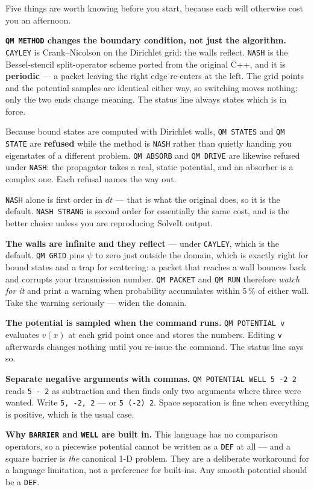 \documentclass[11pt]{article}
\newcommand{\kw}[1]{\texttt{\uppercase{#1}}}
\newcommand{\code}[1]{\texttt{#1}}
\begin{document}
Five things are worth knowing before you start, because each will
otherwise cost you an afternoon.

\textbf{\code{QM METHOD} changes the boundary condition, not just the
algorithm.} \code{CAYLEY} is Crank--Nicolson on the Dirichlet grid: the
walls reflect. \code{NASH} is the Bessel-stencil split-operator scheme
ported from the original C++, and it is \textbf{periodic} --- a packet
leaving the right edge re-enters at the left. The grid points and the
potential samples are identical either way, so switching moves nothing;
only the two ends change meaning. The status line always states which
is in force.

Because bound states are computed with Dirichlet walls, \code{QM STATES}
and \code{QM STATE} are \textbf{refused} while the method is
\code{NASH} rather than quietly handing you eigenstates of a different
problem. \code{QM ABSORB} and \code{QM DRIVE} are likewise refused
under \code{NASH}: the propagator takes a real, static potential, and an
absorber is a complex one. Each refusal names the way out.

\code{NASH} alone is first order in $dt$ --- that is what the original
does, so it is the default. \code{NASH STRANG} is second order for
essentially the same cost, and is the better choice unless you are
reproducing SolveIt output.

\textbf{The walls are infinite and they reflect} --- under
\code{CAYLEY}, which is the default. \code{QM GRID} pins
$\psi$ to zero just outside the domain, which is exactly right for bound
states and a trap for scattering: a packet that reaches a wall bounces
back and corrupts your transmission number. \code{QM PACKET} and
\code{QM RUN} therefore \emph{watch for it} and print a warning when
probability accumulates within 5\,\% of either wall. Take the warning
seriously --- widen the domain.

\textbf{The potential is sampled when the command runs.}
\code{QM POTENTIAL v} evaluates $v(x)$ at each grid point once and
stores the numbers. Editing \code{v} afterwards changes nothing until
you re-issue the command. The status line says so.

\textbf{Separate negative arguments with commas.}
\code{QM POTENTIAL WELL 5 -2 2} reads \code{5 - 2} as subtraction and
then finds only two arguments where three were wanted. Write
\code{5, -2, 2} --- or \code{5 (-2) 2}. Space separation is fine when
everything is positive, which is the usual case.

\textbf{Why \code{BARRIER} and \code{WELL} are built in.} This language
has no comparison operators, so a piecewise potential cannot be written
as a \kw{def} at all --- and a square barrier is \emph{the} canonical
1-D problem. They are a deliberate workaround for a language limitation,
not a preference for built-ins. Any smooth potential should be a
\kw{def}.
\end{document}

